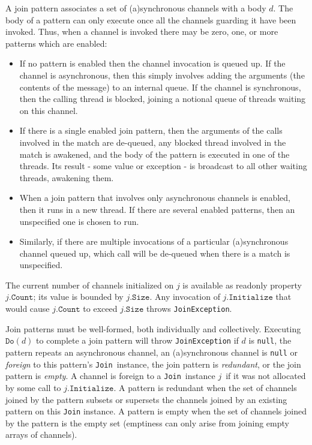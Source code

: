 \documentclass{article}
\newcommand{\cjoin}{{\texttt{Join}}}
\newcommand{\typeref}[1]{{\texttt{#1}}}
\newcommand{\dotinitialize}{\texttt{.Initialize}}
\newcommand{\dotsize}{\texttt{.Size}}
\newcommand{\dotcount}{\texttt{.Count}}
\newcommand{\Do}{\texttt{Do}}
\newcommand{\joinobj}{\ensuremath{j}}
\newcommand{\delegate}{\ensuremath{d}}
\begin{document}
A join pattern associates a set of (a)synchronous channels with a body \delegate.
The body of a pattern can only execute once all the
channels guarding it have been invoked. Thus, when a channel is 
invoked there may be zero, one, or more patterns which are enabled:
\begin{itemize}
\item
If no pattern is enabled then the channel invocation is queued up. If the channel is asynchronous,
then this simply involves adding the arguments (the contents of the message) to an internal queue.
If the channel is synchronous, then the calling thread is blocked, joining a notional queue of threads waiting on this channel.
\item
If there is a single enabled join pattern, then the arguments of the calls involved in the match are de-queued,
any blocked thread involved in the match is awakened, and the body of the pattern is executed in one of the threads.
Its result - some value or exception - is broadcast to all other waiting threads, awakening them.
\item
When a join pattern that involves only asynchronous channels is enabled, then it runs in a new thread.
If there are several enabled patterns, then an unspecified one is chosen to run.
\item
Similarly, if there are multiple invocations of a particular (a)synchronous channel queued up, 
which call will be de-queued when there is a match is unspecified.
\end{itemize}

The current number of channels initialized on $\joinobj$ is available as readonly property $\joinobj\dotcount$; 
its value is bounded by $\joinobj\dotsize$.
Any invocation of $\joinobj\dotinitialize$ that would cause $\joinobj\dotcount$ to exceed $\joinobj\dotsize$ throws \typeref{JoinException}.


Join patterns must be well-formed, both individually and collectively. Executing $\Do(\delegate)$ to
complete a join pattern will throw \typeref{JoinException} if $\delegate$ is
\texttt{null}, the pattern repeats an asynchronous channel, an (a)synchronous
channel is \texttt{null} or \emph{foreign} to this pattern's \cjoin\ instance, the
join pattern is \emph{redundant}, or the join pattern is \emph{empty}.
A channel is foreign to a \cjoin\ instance \joinobj\ if it was not allocated by some call to
$\joinobj\dotinitialize$.
A pattern is redundant when the set
of channels joined by the pattern subsets or supersets the channels
joined by an existing pattern on this \texttt{Join} instance.
A pattern is empty when the set of channels joined by the pattern is the empty set 
(emptiness can only arise from joining empty arrays of channels).
\end{document}
